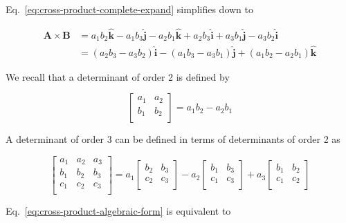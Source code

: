 Eq.~\ref{eq:cross-product-complete-expand} simplifies down to

\begin{align}
    \boldsymbol{A} \times \boldsymbol{B} &= a_1 b_2 \boldsymbol{\hat{k}} - a_1 b_3 \boldsymbol{\hat{j}} - a_2 b_1 \boldsymbol{\hat{k}} + a_2 b_3 \boldsymbol{\hat{i}} + a_3 b_1 \boldsymbol{\hat{j}} - a_3 b_2 \boldsymbol{\hat{i}} \\
    &= (a_2 b_3 - a_3 b_2)\boldsymbol{\hat{i}} - (a_1 b_3 - a_3 b_1)\boldsymbol{\hat{j}} + (a_1 b_2 - a_2 b_1)\boldsymbol{\hat{k}}\label{eq:cross-product-algebraic-form}
\end{align}

We recall that a determinant of order 2 is defined by

\begin{equation}
    \renewcommand{\arraystretch}{2}
    \begin{bmatrix}
        a_1 & a_2 \\
        b_1 & b_2 \\
    \end{bmatrix} = a_1 b_2 - a_2 b_1
\end{equation}

A determinant of order 3 can be defined in terms of determinants of order 2 as

\begin{equation}
    \begin{bmatrix}
        a_1 & a_2 & a_3 \\
        b_1 & b_2 & b_3 \\
        c_1 & c_2 & c_3 \\
    \end{bmatrix} =
    a_1 \begin{bmatrix}
        b_2 & b_3 \\
        c_2 & c_3 \\
    \end{bmatrix} -
    a_2 \begin{bmatrix}
        b_1 & b_3 \\
        c_1 & c_3 \\
    \end{bmatrix} +
    a_3 \begin{bmatrix}
        b_1 & b_2 \\
        c_1 & c_2 \\
    \end{bmatrix}
\end{equation}

Eq.~\ref{eq:cross-product-algebraic-form} is equivalent to

